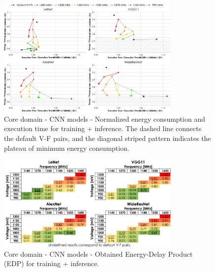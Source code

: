 \begin{figure}[htb]
    \centering
        \includegraphics[width=0.8\textwidth]{Figures/Application To Deep Learning/CNN_behaviour.pdf}
        \caption{Core domain - CNN models - Normalized energy consumption and execution time for training + inference. The dashed line connects the default V-F pairs, and the diagonal striped pattern indicates the plateau of minimum energy consumption.}
    \label{fig:CNN_Behaviour_training_inf}
\end{figure}

\begin{figure}[htb]
    \centering
        \includegraphics[width=0.8\textwidth]{Figures/Application To Deep Learning/CNN_EDP.pdf}
        \caption{Core domain - CNN models - Obtained Energy-Delay Product (EDP) for training + inference.}
    \label{fig:CNN_EDP_training_inf}
\end{figure}

